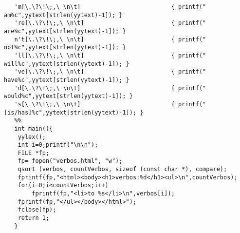 \documentclass{report}
\begin{document}
\begin{verbatim}
   'm[\.\?\!\;,\ \n\t]                      	{ printf(" am%c",yytext[strlen(yytext)-1]); }
   're[\.\?\!\;,\ \n\t]                     	{ printf(" are%c",yytext[strlen(yytext)-1]); }
   n't[\.\?\!\;,\ \n\t]                     	{ printf(" not%c",yytext[strlen(yytext)-1]); }
   'll[\.\?\!\;,\ \n\t]                     	{ printf(" will%c",yytext[strlen(yytext)-1]); }
   've[\.\?\!\;,\ \n\t]                     	{ printf(" have%c",yytext[strlen(yytext)-1]); }
   'd[\.\?\!\;,\ \n\t]                      	{ printf(" would%c",yytext[strlen(yytext)-1]); }
   's[\.\?\!\;,\ \n\t]                      	{ printf(" [is/has]%c",yytext[strlen(yytext)-1]); }
   %%
   int main(){
   	yylex();
   	int i=0;printf("\n\n");
   	FILE *fp;
   	fp= fopen("verbos.html", "w");
   	qsort (verbos, countVerbos, sizeof (const char *), compare);
   	fprintf(fp,"<html><body><h1>verbos:%d</h1><ul>\n",countVerbos);
   	for(i=0;i<countVerbos;i++)
       	fprintf(fp,"<li>to %s</li>\n",verbos[i]);
   	fprintf(fp,"</ul></body></html>");
   	fclose(fp);
   	return 1;
   }
\end{verbatim}



\end{document}
